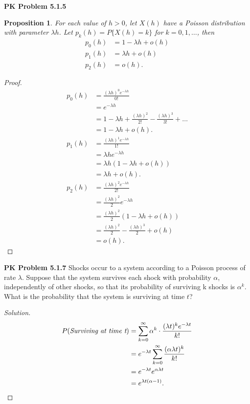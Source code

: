 \documentclass{article}
\newtheorem{prop}[thm]{Proposition}
\begin{document}
\textbf{PK Problem 5.1.5}
\begin{prop}
    For each value of $h > 0$, let $X(h)$ have a Poisson distribution with parameter $\lambda h$. 
    Let $p_k(h) = P\{X(h) = k\}$ for $k = 0,1,\dots$, then
    \begin{align*}
        p_0(h) & = 1-\lambda h +o(h) \\
        p_1(h) & = \lambda h + o(h) \\
        p_2(h) & = o(h).
    \end{align*}
\end{prop}
\begin{proof}
    \begin{align*}
        p_0(h) & = \frac{(\lambda h)^{0}e^{-\lambda h}}{0!} \\ 
        & = e^{-\lambda h} \\
        & = 1 - \lambda h + \frac{(\lambda h)^2}{2!} - \frac{(\lambda h)^3}{3!} + \dots \\
        & = 1 - \lambda h + o(h). \\
        p_1(h) & = \frac{(\lambda h)^{1}e^{-\lambda h}}{1!} \\
        & = \lambda h e^{-\lambda h} \\
        & = \lambda h (1 - \lambda h + o(h)) \\
        & = \lambda h + o(h). \\
        p_2(h) & = \frac{(\lambda h)^{2}e^{-\lambda h}}{2!} \\
        & = \frac{(\lambda h)^2}{2}e^{-\lambda h} \\
        & = \frac{(\lambda h)^2}{2}(1 - \lambda h + o(h)) \\ 
        & = \frac{(\lambda h)^2}{2} - \frac{(\lambda h)^3}{2} + o(h) \\
        & = o(h).
    \end{align*}
\end{proof}
\bigbreak

\textbf{PK Problem 5.1.7}
Shocks occur to a system according to a Poisson process of rate $\lambda$. 
Suppose that the system survives each shock with probability $\alpha$, independently of other shocks, so that its probability of surviving k shocks is $\alpha^k$. 
What is the probability that the system is surviving at time $t$?
\begin{proof}[Solution]
    \begin{align*}
        P(\emph{Surviving at time t}) & =\sum_{k=0}^{\infty}\alpha^k\cdot \frac{(\lambda t)^ke^{-\lambda t}}{k!} \\ 
        & = e^{-\lambda t} \sum_{k=0}^{\infty} \frac{(\alpha\lambda t)^k}{k!} \\
        & = e^{-\lambda t} e^{\alpha\lambda t} \\
        & = e^{\lambda t (\alpha -1)}.
    \end{align*}
\end{proof}
\bigbreak
\end{document}
